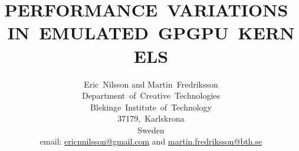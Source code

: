\documentclass[a4paper,twocolumn,10pt]{article}
\begin{document}
\title{PERFORMANCE~VARIATIONS~IN~EMULATED~GPGPU~KERNELS}
\author{Eric~Nilsson and Martin~Fredriksson\\
Department~of~Creative~Technologies\\
Blekinge~Institute~of~Technology\\
37179,~Karlskrona\\
Sweden\\
email: \href{mailto:EricNNilsson@gmail.com}{ericnnilsson@gmail.com} and \href{mailto:martin.fredriksson@bth.se}{martin.fredriksson@bth.se}}
\date{}

\maketitle

\thispagestyle{empty}






\newpage



\newpage



\newpage


\end{document}
